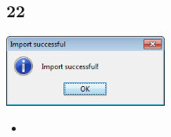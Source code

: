 \documentclass{beamer}
\begin{document}
\subsection{22}
\begin{frame}
	\begin{center}
  		\includegraphics[width=0.4\textwidth]{22.png}
	\end{center}
	\begin{itemize}
		\item
	\end{itemize}
\end{frame}
\end{document}
